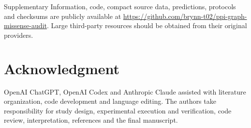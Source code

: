 \documentclass[conference]{IEEEtran}
\begin{document}
Supplementary Information, code, compact source data, predictions, protocols and checksums are publicly available at \url{https://github.com/brynn-t02/ppi-graph-missense-audit}. Large third-party resources should be obtained from their original providers.

\section*{Acknowledgment}

OpenAI ChatGPT, OpenAI Codex and Anthropic Claude assisted with literature organization, code development and language editing. The authors take responsibility for study design, experimental execution and verification, code review, interpretation, references and the final manuscript.

\end{document}
